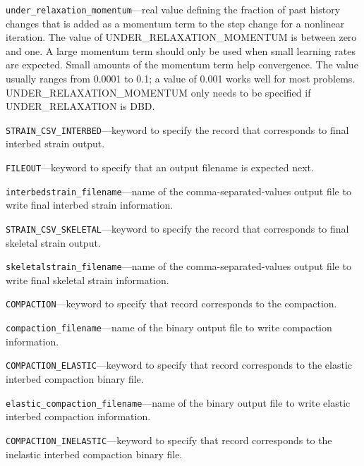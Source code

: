 \begin{description}
\item \texttt{under\_relaxation\_momentum}---real value defining the fraction of past history changes that is added as a momentum term to the step change for a nonlinear iteration. The value of UNDER\_RELAXATION\_MOMENTUM is between zero and one. A large momentum term should only be used when small learning rates are expected. Small amounts of the momentum term help convergence. The value usually ranges from 0.0001 to 0.1; a value of 0.001 works well for most problems. UNDER\_RELAXATION\_MOMENTUM only needs to be specified if UNDER\_RELAXATION is DBD.

\item \texttt{STRAIN\_CSV\_INTERBED}---keyword to specify the record that corresponds to final interbed strain output.

\item \texttt{FILEOUT}---keyword to specify that an output filename is expected next.

\item \texttt{interbedstrain\_filename}---name of the comma-separated-values output file to write final interbed strain information.

\item \texttt{STRAIN\_CSV\_SKELETAL}---keyword to specify the record that corresponds to final skeletal strain output.

\item \texttt{skeletalstrain\_filename}---name of the comma-separated-values output file to write final skeletal strain information.

\item \texttt{COMPACTION}---keyword to specify that record corresponds to the compaction.

\item \texttt{compaction\_filename}---name of the binary output file to write compaction information.

\item \texttt{COMPACTION\_ELASTIC}---keyword to specify that record corresponds to the elastic interbed compaction binary file.

\item \texttt{elastic\_compaction\_filename}---name of the binary output file to write elastic interbed compaction information.

\item \texttt{COMPACTION\_INELASTIC}---keyword to specify that record corresponds to the inelastic interbed compaction binary file.


\end{description}
